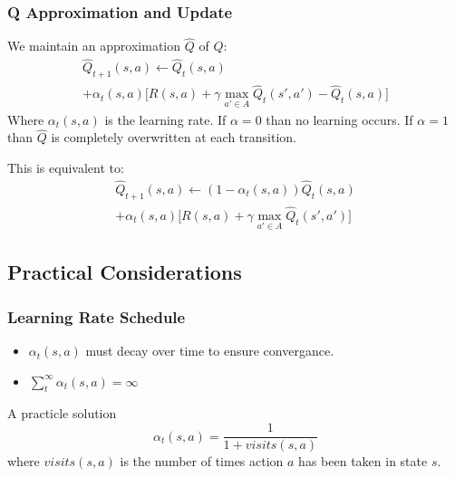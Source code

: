 \documentclass[ignorenonframetext]{beamer}
\begin{document}
\begin{frame}
	\frametitle{Q Approximation and Update}
	We maintain an approximation $\hat{Q}$ of $Q$:
	\begin{multline*}
			\hat{Q}_{t+1}(s,a) \leftarrow \hat{Q}_t(s,a) \\
			+ \alpha_t(s,a)\big[ R(s,a) + \gamma \max_{a' \in A}
		\hat{Q}_t(s',a') - \hat{Q}_t(s,a) \big]
	\end{multline*}
	Where $\alpha_t(s,a)$ is the learning rate.  
	If $\alpha = 0$ than no learning occurs.  If $\alpha = 1$ than
	$\hat{Q}$ is completely overwritten at each transition.

	\pause
	This is equivalent to:
	\begin{multline*}
		\hat{Q}_{t+1}(s,a) \leftarrow (1-\alpha_t(s,a))\hat{Q}_{t}(s,a) \\
		+ \alpha_t(s,a)\big[ R(s,a) + \gamma \max_{a' \in A} \hat{Q}_t(s',a') \big]
	\end{multline*}
\end{frame}

\subsection{Practical Considerations}

\begin{frame}
	\frametitle{Learning Rate Schedule}
	\begin{itemize}
		\item $\alpha_t(s,a)$ must decay over time to ensure convergance.
		\pause
		\item $\sum_t^{\infty} \alpha_t(s,a) = \infty$ 
		\pause
	\end{itemize}
	\begin{block}{A practicle solution}
		\[
		\alpha_t(s,a) = \frac{1}{1 + visits(s,a)}
		\]
		where $visits(s,a)$ is the number of times action $a$ has been
		taken in state $s$.
	\end{block}
\end{frame}
\end{document}
